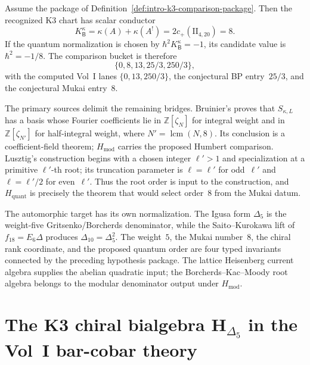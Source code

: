 \begin{conjecture}
\label{conj:intro-k3-b-row-candidate}
Assume the package of
Definition~\ref{def:intro-k3-comparison-package}.  Then the recognized
K3 chart has scalar conductor
\[
K^\kappa_{\mathsf B}
=\kappa(A)+\kappa(A^!)
=2c_+(\mathrm{II}_{4,20})=8.
\]
If the quantum normalization is chosen by
\(\hbar^2K^\kappa_{\mathsf B}=-1\), its candidate value is
\(\hbar^2=-1/8\).  The comparison bucket is therefore
\[
\{0,8,13,25/3,250/3\},
\]
with the computed Vol~I lanes
$\{0,13,250/3\}$, the conjectural BP entry~$25/3$, and the
conjectural Mukai entry~$8$.
\end{conjecture}

The primary sources delimit the remaining bridges.  Bruinier's
\cite[Lemma~5.1]{Bruinier2002} proves that $S_{\kappa,L}$ has a basis
whose Fourier coefficients lie in $\mathbb Z[\zeta_N]$ for integral
weight and in $\mathbb Z[\zeta_{N'}]$ for half-integral weight, where
\(N'=\operatorname{lcm}(N,8)\).  Its conclusion is a coefficient-field
theorem; $H_{\mathrm{mod}}$ carries the proposed Humbert comparison.
Lusztig's \cite[\S5.1]{Lusztig1990} construction begins with a chosen
integer $\ell'>1$ and specialization at a primitive
\(\ell'\)-th root; its truncation parameter is
\(\ell=\ell'\) for odd~\(\ell'\) and
\(\ell=\ell'/2\) for even~\(\ell'\).  Thus the root order is input to
the construction, and $H_{\mathrm{quant}}$ is precisely the theorem
that would select order~$8$ from the Mukai datum.

The automorphic target has its own normalization.  The Igusa form
\(\Delta_5\) is the weight-five Gritsenko/Borcherds denominator, while
the Saito--Kurokawa lift of $f_{18}=E_6\Delta$ produces
$\Delta_{10}=\Delta_5^2$.  The weight~$5$, the Mukai number~$8$,
the chiral rank coordinate, and the proposed quantum order are four
typed invariants connected by the preceding hypothesis package.  The
lattice Heisenberg current algebra supplies the abelian quadratic
input; the Borcherds--Kac--Moody root algebra belongs to the modular
denominator output under $H_{\mathrm{mod}}$.


\section{\texorpdfstring{The K3 chiral bialgebra $\mathbf H_{\Delta_5}$ in the Vol~I bar-cobar theory}{The K3 chiral bialgebra H Delta 5 in the Vol I bar-cobar theory}}
\label{sec:v1-intro-supplement}

